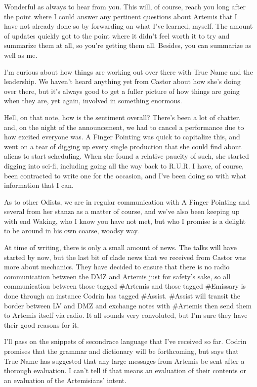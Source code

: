 Wonderful as always to hear from you. This will, of course, reach you long after the point where I could answer any pertinent questions about Artemis that I have not already done so by forwarding on what I've learned, myself. The amount of updates quickly got to the point where it didn't feel worth it to try and summarize them at all, so you're getting them all. Besides, you can summarize as well as me.

I'm curious about how things are working out over there with True Name and the leadership. We haven't heard anything yet from Castor about how she's doing over there, but it's always good to get a fuller picture of how things are going when they are, yet again, involved in something enormous.

Hell, on that note, how is the sentiment overall? There's been a lot of chatter, and, on the night of the announcement, we had to cancel a performance due to how excited everyone was. A Finger Pointing was quick to capitalize this, and went on a tear of digging up every single production that she could find about aliens to start scheduling. When she found a relative paucity of such, she started digging into sci-fi, including going all the way back to R.U.R. I have, of course, been contracted to write one for the occasion, and I've been doing so with what information that I can.

As to other Odists, we are in regular communication with A Finger Pointing and several from her stanza as a matter of course, and we've also been keeping up with end Waking, who I know you have not met, but who I promise is a delight to be around in his own coarse, woodsy way.

At time of writing, there is only a small amount of news. The talks will have started by now, but the last bit of clade news that we received from Castor was more about mechanics. They have decided to ensure that there is no radio communication between the DMZ and Artemis just for safety's sake, so all communication between those tagged \#Artemis and those tagged \#Emissary is done through an instance Codrin has tagged \#Assist. \#Assist will transit the border between LV and DMZ and exchange notes with \#Artemis then send them to Artemis itself via radio. It all sounds very convoluted, but I'm sure they have their good reasons for it.

I'll pass on the snippets of secondrace language that I've received so far. Codrin promises that the grammar and dictionary will be forthcoming, but says that True Name has suggested that any large messages from Artemis be sent after a thorough evaluation. I can't tell if that means an evaluation of their contents or an evaluation of the Artemisians' intent.


